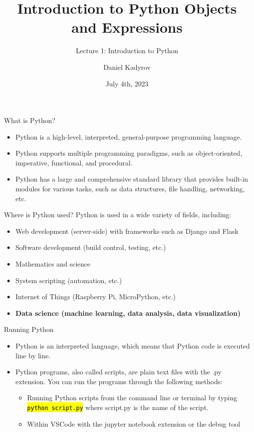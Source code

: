 \documentclass[
    aspectratio=169, 
    usepdftitle=false, 
    xcolor={dvipsnames},
    hyperref={
        colorlinks,
        linkcolor=black,
        urlcolor=blue}
    ]{beamer}
\title[Introduction to Python]{Introduction to Python Objects and Expressions}
\subtitle{Lecture 1: Introduction to Python}
\author{Daniel Kadyrov}
\date{July 4th, 2023}
\let\OldTexttt\texttt
\renewcommand{\texttt}[1]{\OldTexttt{\hl{#1}}}%
\begin{document}
\begin{frame}
    \titlepage
\end{frame}

\begin{frame}{What is Python?}
    \begin{itemize}
        \item Python is a high-level, interpreted, general-purpose programming language.
        \item Python supports multiple programming paradigms, such as object-oriented, imperative, functional, and procedural.
        \item Python has a large and comprehensive standard library that provides built-in modules for various tasks, such as data structures, file handling, networking, etc.
    \end{itemize}
\end{frame}

\begin{frame}{Where is Python used?}
    Python is used in a wide variety of fields, including:
    \begin{itemize}
        \item Web development (server-side) with frameworks such as Django and Flask
        \item Software development (build control, testing, etc.)
        \item Mathematics and science
        \item System scripting (automation, etc.)
        \item Internet of Things (Raspberry Pi, MicroPython, etc.)
        \item \textbf{Data science (machine learning, data analysis, data visualization)}
    \end{itemize}
\end{frame}

\begin{frame}{Running Python}
    \begin{itemize}
        \item Python is an interpreted language, which means that Python code is executed line by line.
        \item Python programs, also called scripts, are plain text files with the .py extension. You can run the programs through the following methods:
              \begin{itemize}
                  \item Running Python scripts from the command line or terminal by typing \texttt{python script.py} where script.py is the name of the script.
                  \item Within VSCode with the jupyter notebook extension or the debug tool
              \end{itemize}
    \end{itemize}
\end{frame}
\end{document}

